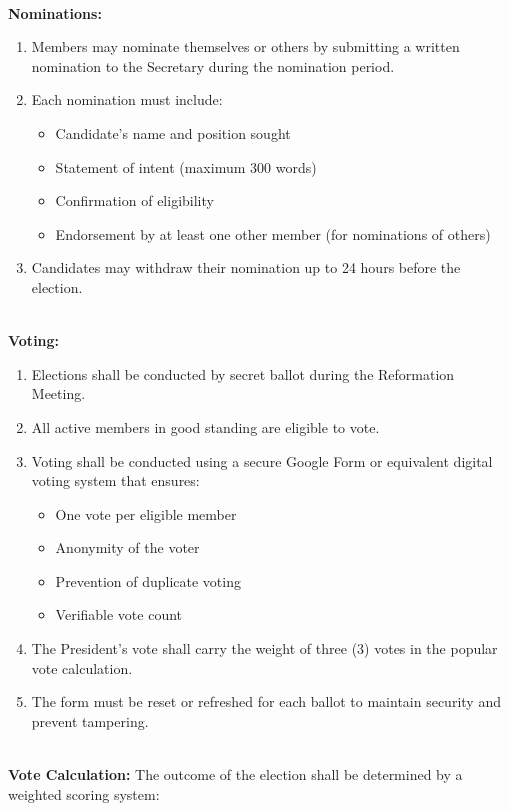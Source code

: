 \\
\textbf{Nominations:}
\begin{enumerate}[label=\alph*), leftmargin=2em, itemsep=0.3em]
    \item Members may nominate themselves or others by submitting a written nomination to the Secretary during the nomination period.
    \item Each nomination must include:
    \begin{itemize}[leftmargin=1.5em, itemsep=0.2em]
        \item Candidate's name and position sought
        \item Statement of intent (maximum 300 words)
        \item Confirmation of eligibility
        \item Endorsement by at least one other member (for nominations of others)
    \end{itemize}
    \item Candidates may withdraw their nomination up to 24 hours before the election.
\end{enumerate}
\\
\textbf{Voting:}
\begin{enumerate}[label=\alph*), leftmargin=2em, itemsep=0.3em]
    \item Elections shall be conducted by secret ballot during the Reformation Meeting.
    
    \item All active members in good standing are eligible to vote.
    
    \item Voting shall be conducted using a secure Google Form or equivalent digital voting system that ensures:
    \begin{itemize}[leftmargin=1.5em, itemsep=0.2em]
        \item One vote per eligible member
        \item Anonymity of the voter
        \item Prevention of duplicate voting
        \item Verifiable vote count
    \end{itemize}
    
    \item The President's vote shall carry the weight of three (3) votes in the popular vote calculation.
    
    \item The form must be reset or refreshed for each ballot to maintain security and prevent tampering.
\end{enumerate}
\\
\textbf{Vote Calculation:}
The outcome of the election shall be determined by a weighted scoring system:

